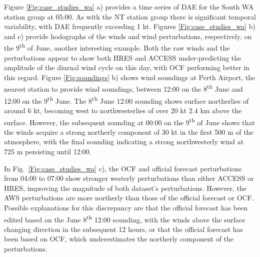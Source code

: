 \documentclass{ametsoc}
\begin{document}
Figure \ref{Fig:case_studies_wa} a) provides a time series of DAE for the South WA station group at 05:00. As with the NT station group there is significant temporal variability, with DAE frequently exceeding 1 kt. Figures \ref{Fig:case_studies_wa} b) and c) provide hodographs of the winds and wind perturbations, respectively, on the 9\textsuperscript{th} of June, another interesting example. Both the raw winds and the perturbations appear to show both HRES and ACCESS under-predicting the amplitude of the diurnal wind cycle on this day, with OCF performing better in this regard. Figure \ref{Fig:soundings} b) shows wind soundings at Perth Airport, the nearest station to provide wind soundings, between 12:00 on the 8\textsuperscript{th} June and 12:00 on the 9\textsuperscript{th} June. The 8\textsuperscript{th} June 12:00 sounding shows surface northerlies of around $6$ kt, becoming west to northwesterlies of over 20 kt $2.4$ km above the surface. However, the subsequent sounding at 00:00 on the 9\textsuperscript{th} of June shows that the winds acquire a strong northerly component of 30 kt in the first 500 m of the atmosphere, with the final sounding indicating a strong northwesterly wind at 725 m persisting until 12:00. 

In Fig.~\ref{Fig:case_studies_wa} c), the OCF and official forecast perturbations from 04:00 to 07:00 show stronger westerly perturbations than either ACCESS or HRES, improving the magnitude of both dataset's perturbations. However, the AWS perturbations are more northerly than those of the official forecast or OCF. Possible explanations for this discrepancy are that the official forecast has been edited based on the June 8\textsuperscript{th} 12:00 sounding, with the winds above the surface changing direction in the subsequent 12 hours, or that the official forecast has been based on OCF, which underestimates the northerly component of the perturbations.
\end{document}
